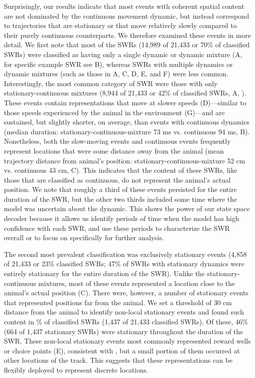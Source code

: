 \documentclass[9pt,lineno]{elife}
\begin{document}
Surprisingly, our results indicate that most events with coherent spatial content are not dominated by the continuous movement dynamic, but instead correspond to trajectories that are stationary or that move relatively slowly compared to their purely continuous counterparts. We therefore examined these events in more detail. We first note that most of the SWRs (14,989 of 21,433 or 70\% of classified SWRs) were classified as having only a single dynamic or dynamic mixture (A, for specific example SWR see B), whereas SWRs with multiple dynamics or dynamic mixtures (such as those in A, C, D, E, and F) were less common. Interestingly, the most common category of SWR were those with only stationary-continuous mixtures (8,944 of 21,433 or 42\% of classified SWRs, A, ). These events contain representations that move at slower speeds (D)---similar to those speeds experienced by the animal in the environment (G)---and are sustained, but slightly shorter, on average, than events with continuous dynamics (median duration: stationary-continuous-mixture 73 ms vs. continuous 94 ms, B). Nonetheless, both the slow-moving events and continuous events frequently represent locations that were some distance away from the animal (mean trajectory distance from animal's position: stationary-continuous-mixture 52 cm vs. continuous 43 cm, C). This indicates that the content of these SWRs, like those that are classified as continuous, do not represent the animal's actual position. We note that roughly a third of these events persisted for the entire duration of the SWR, but the other two thirds included some time where the model was uncertain about the dynamic. This shows the power of our state space decoder because it allows us identify periods of time when the model has high confidence with each SWR, and use these periods to characterize the SWR overall or to focus on specifically for further analysis. 

The second most prevalent classification was exclusively stationary events (4,858 of 21,433 or 23\% classified SWRs; 47\% of SWRs with stationary dynamics were entirely stationary for the entire duration of the SWR). Unlike the stationary-continuous mixtures, most of these events represented a location close to the animal's actual position (C). There were, however, a number of stationary events that represented positions far from the animal. We set a threshold of 30 cm distance from the animal to identify non-local stationary events and found such content in \% of classified SWRs (1,437 of 21,433 classified SWRs). Of these, 46\% (664 of 1,437 stationary SWRs) were stationary throughout the duration of the SWR. These non-local stationary events most commonly represented reward wells or choice points (E), consistent with \citep{YuDistincthippocampalcorticalmemory2017}, but a small portion of them occurred at other locations of the track. This suggests that these representations can be flexibly deployed to represent discrete locations.
\end{document}
